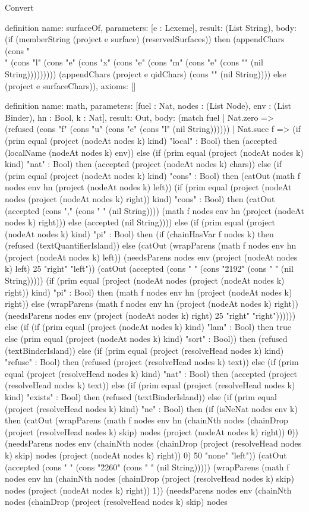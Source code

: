 \begin{lexlean}{Convert}
\begin{semanticmodule}
definition{
  name: surfaceOf,
  parameters: [e : Lexeme],
  result: (List String),
  body: (if (memberString (project e surface) (reservedSurfaces)) then (appendChars (cons "\\" (cons "l" (cons "e" (cons "x" (cons "e" (cons "m" (cons "e" (cons "{" (nil String))))))))) (appendChars (project e qidChars) (cons "}" (nil String)))) else (project e surfaceChars)),
  axioms: []
}

definition{
  name: math,
  parameters: [fuel : Nat, nodes : (List Node), env : (List Binder), hn : Bool, k : Nat],
  result: Out,
  body: (match fuel
    | Nat.zero => (refused (cons "f" (cons "u" (cons "e" (cons "l" (nil String))))))
    | Nat.succ f => (if (prim equal (project (nodeAt nodes k) kind) "local" : Bool) then (accepted (localName (nodeAt nodes k) env)) else (if (prim equal (project (nodeAt nodes k) kind) "nat" : Bool) then (accepted (project (nodeAt nodes k) chars)) else (if (prim equal (project (nodeAt nodes k) kind) "cons" : Bool) then (catOut (math f nodes env hn (project (nodeAt nodes k) left)) (if (prim equal (project (nodeAt nodes (project (nodeAt nodes k) right)) kind) "cons" : Bool) then (catOut (accepted (cons "," (cons " " (nil String)))) (math f nodes env hn (project (nodeAt nodes k) right))) else (accepted (nil String)))) else (if (prim equal (project (nodeAt nodes k) kind) "pi" : Bool) then (if (chainHasVar f nodes k) then (refused (textQuantifierIsland)) else (catOut (wrapParens (math f nodes env hn (project (nodeAt nodes k) left)) (needsParens nodes env (project (nodeAt nodes k) left) 25 "right" "left")) (catOut (accepted (cons " " (cons "\u2192" (cons " " (nil String))))) (if (prim equal (project (nodeAt nodes (project (nodeAt nodes k) right)) kind) "pi" : Bool) then (math f nodes env hn (project (nodeAt nodes k) right)) else (wrapParens (math f nodes env hn (project (nodeAt nodes k) right)) (needsParens nodes env (project (nodeAt nodes k) right) 25 "right" "right")))))) else (if (if (prim equal (project (nodeAt nodes k) kind) "lam" : Bool) then true else (prim equal (project (nodeAt nodes k) kind) "sort" : Bool)) then (refused (textBinderIsland)) else (if (prim equal (project (resolveHead nodes k) kind) "refuse" : Bool) then (refused (project (resolveHead nodes k) text)) else (if (prim equal (project (resolveHead nodes k) kind) "nat" : Bool) then (accepted (project (resolveHead nodes k) text)) else (if (prim equal (project (resolveHead nodes k) kind) "exists" : Bool) then (refused (textBinderIsland)) else (if (prim equal (project (resolveHead nodes k) kind) "ne" : Bool) then (if (isNeNat nodes env k) then (catOut (wrapParens (math f nodes env hn (chainNth nodes (chainDrop (project (resolveHead nodes k) skip) nodes (project (nodeAt nodes k) right)) 0)) (needsParens nodes env (chainNth nodes (chainDrop (project (resolveHead nodes k) skip) nodes (project (nodeAt nodes k) right)) 0) 50 "none" "left")) (catOut (accepted (cons " " (cons "\u2260" (cons " " (nil String))))) (wrapParens (math f nodes env hn (chainNth nodes (chainDrop (project (resolveHead nodes k) skip) nodes (project (nodeAt nodes k) right)) 1)) (needsParens nodes env (chainNth nodes (chainDrop (project (resolveHead nodes k) skip) nodes }
\end{semanticmodule}
\end{lexlean}
